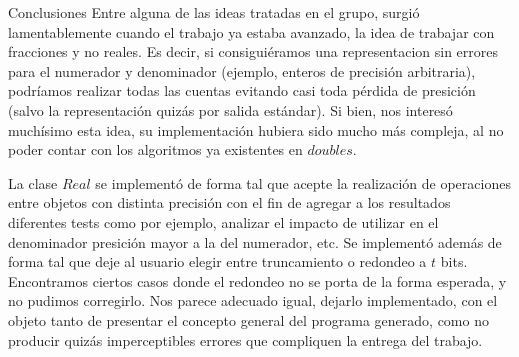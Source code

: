\begin{section}{Conclusiones}
	Entre alguna de las ideas tratadas en el grupo, surgió lamentablemente cuando el trabajo ya estaba avanzado, la idea de trabajar con fracciones y no reales. Es decir, si consiguiéramos una representacion sin errores para el numerador y denominador (ejemplo, enteros de precisión arbitraria), podríamos realizar todas las cuentas evitando casi toda pérdida de presición (salvo la representación quizás por salida estándar). Si bien, nos interesó muchísimo esta idea, su implementación hubiera sido mucho más compleja, al no poder contar con los algoritmos ya existentes en $doubles$.
	
	La clase $Real$ se implementó de forma tal que acepte la realización de operaciones entre objetos con distinta precisión con el fin de agregar a los resultados diferentes tests como por ejemplo, analizar el impacto de utilizar en el denominador presición mayor a la del numerador, etc. Se implementó además de forma tal que deje al usuario elegir entre truncamiento o redondeo a $t$ bits. Encontramos ciertos casos donde el redondeo no se porta de la forma esperada, y no pudimos corregirlo. Nos parece adecuado igual, dejarlo implementado, con el objeto tanto de presentar el concepto general del programa generado, como no producir quizás imperceptibles errores que compliquen la entrega del trabajo. 

\end{section}
